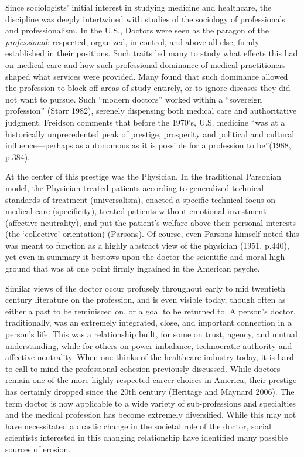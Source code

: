 \documentclass[12pt,twoside]{reedthesis}
\begin{document}
  Since sociologists' initial interest in studying medicine and
  healthcare, the discipline was deeply intertwined with studies of the
  sociology of professionals and professionalism. In the U.S., Doctors
  were seen as the paragon of the \emph{professional}: respected,
  organized, in control, and above all else, firmly established in their
  positions. Such traits led many to study what effects this had on
  medical care and how such professional dominance of medical
  practitioners shaped what services were provided. Many found that such
  dominance allowed the profession to block off areas of study entirely,
  or to ignore diseases they did not want to pursue. Such ``modern
  doctors'' worked within a ``sovereign profession'' (Starr 1982),
  serenely dispensing both medical care and authoritative judgment.
  Freidson comments that before the 1970's, U.S. medicine ``was at a
  historically unprecedented peak of prestige, prosperity and political
  and cultural influence---perhaps as autonomous as it is possible for a
  profession to be''(1988, p.384).
  
  At the center of this prestige was the Physician. In the traditional
  Parsonian model, the Physician treated patients according to generalized
  technical standards of treatment (universalism), enacted a specific
  technical focus on medical care (specificity), treated patients without
  emotional investment (affective neutrality), and put the patient's
  welfare above their personal interests (the `collective' orientation)
  (Parsons). Of course, even Parsons himself noted this was meant to
  function as a highly abstract view of the physician (1951, p.440), yet
  even in summary it bestows upon the doctor the scientific and moral high
  ground that was at one point firmly ingrained in the American psyche.
  
  Similar views of the doctor occur profusely throughout early to mid
  twentieth century literature on the profession, and is even visible
  today, though often as either a past to be reminisced on, or a goal to
  be returned to. A person's doctor, traditionally, was an extremely
  integrated, close, and important connection in a person's life. This was
  a relationship built, for some on trust, agency, and mutual
  understanding, while for others on power imbalance, technocratic
  authority and affective neutrality. When one thinks of the healthcare
  industry today, it is hard to call to mind the professional cohesion
  previously discussed. While doctors remain one of the more highly
  respected career choices in America, their prestige has certainly
  dropped since the 20th century (Heritage and Maynard 2006). The term
  doctor is now applicable to a wide variety of sub-professions and
  specialties and the medical profession has become extremely diversified.
  While this may not have necessitated a drastic change in the societal
  role of the doctor, social scientists interested in this changing
  relationship have identified many possible sources of erosion.
  
\end{document}

